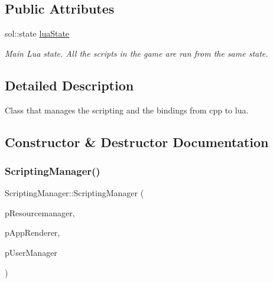 \subsection*{Public Attributes}
\begin{DoxyCompactItemize}
\item 
\mbox{\label{classScriptingManager_a168106b9f3693d9237b4445b177ba477}} 
sol\+::state \hyperlink{classScriptingManager_a168106b9f3693d9237b4445b177ba477}{lua\+State}
\begin{DoxyCompactList}\small\item\em Main Lua state. All the scripts in the game are ran from the same state. \end{DoxyCompactList}\end{DoxyCompactItemize}


\subsection{Detailed Description}
Class that manages the scripting and the bindings from cpp to lua. 

\subsection{Constructor \& Destructor Documentation}
\mbox{\label{classScriptingManager_afc9f4dc0241ba5a7aec3258757b18bff}} 
\subsubsection{\texorpdfstring{Scripting\+Manager()}{ScriptingManager()}}
{\footnotesize\ttfamily Scripting\+Manager\+::\+Scripting\+Manager (\begin{DoxyParamCaption}\item[{\hyperlink{classResourceManager}{Resource\+Manager} $\ast$}]{p\+Resourcemanager,  }\item[{\hyperlink{classAppRenderer}{App\+Renderer} $\ast$}]{p\+App\+Renderer,  }\item[{\hyperlink{classUserManager}{User\+Manager} $\ast$}]{p\+User\+Manager }\end{DoxyParamCaption})}



